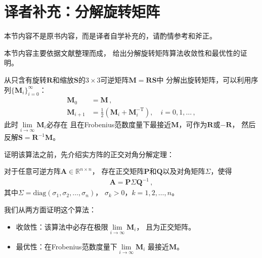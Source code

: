 \section{译者补充：分解旋转矩阵}\label{sec:译者补充：分解旋转矩阵}
\begin{remark}
    本节内容不是原书内容，而是译者自学补充的，请酌情参考和斧正。
\end{remark}

本节内容主要依据文献\citep{doi:10.1137/0907079,10.5555/155294.155324}整理而成，
给出分解旋转矩阵算法收敛性和最优性的证明。

从只含有旋转$\bm R$和缩放$\bm S$的$3\times3$可逆矩阵$\bm M=\bm R\bm S$中
分解出旋转矩阵，可以利用序列$\displaystyle\{\bm M_i\}_{i=0}^{\infty}$：
\begin{align}
    \bm M_0     & =\bm M\, ,                                                         \\
    \bm M_{i+1} & =\frac{1}{2}(\bm M_i+\bm M_i^{-\mathrm{T}}),\quad i=0,1,\ldots\, ,
\end{align}
此时$\displaystyle \lim\limits_{i \to \infty}{\bm M_i}$必存在
且在Frobenius范数度量下最接近$\bm M$，可作为$\bm R$或$-\bm R$，
然后反解$\bm S=\bm R^{-1}\bm M$。

证明该算法之前，先介绍实方阵的正交对角分解定理：
\begin{theorem}
    对于任意可逆方阵$\bm A\in\mathbb{R}^{n\times n}$，
    存在正交矩阵$\bm P$和$\bm Q$以及对角矩阵$\bm \varSigma$，使得
    \begin{align}
        \bm A=\bm P\bm \varSigma\bm Q^{-1}\, ,
    \end{align}
    其中$\bm \varSigma=\mathrm{diag}(\sigma_1,\sigma_2,\ldots,\sigma_n)$，
    $\sigma_k>0$，$k=1,2,\ldots,n$。
\end{theorem}

我们从两方面证明这个算法：
\begin{itemize}
    \item 收敛性：该算法中必存在极限$\displaystyle\lim\limits_{i\rightarrow\infty}\bm M_i$，
          且为正交矩阵。
    \item 最优性：在Frobenius范数度量下$\displaystyle\lim\limits_{i\rightarrow\infty}\bm M_i$
          最接近$\bm M$。
\end{itemize}

